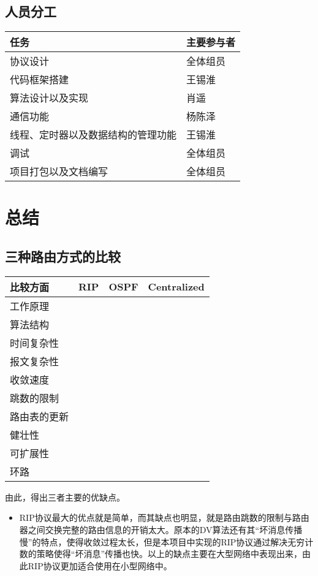 \documentclass[15pt]{ctexart}
\begin{document}
	\subsection{人员分工} %
	\label{sub:人员分工}
		\begin{table}[H]
			\centering
			\begin{tabular}{|l|l|}
				\hline
				任务 & 主要参与者 \\
				\hline
				协议设计 & 全体组员 \\
				\hline
				代码框架搭建 & 王锡淮 \\
				\hline
				算法设计以及实现 & 肖遥 \\
				\hline
				通信功能 & 杨陈泽 \\
				\hline
				线程、定时器以及数据结构的管理功能 & 王锡淮\\
				\hline 
				调试 & 全体组员 \\
				\hline
				项目打包以及文档编写 & 全体组员\\
				\hline
			\end{tabular}
		\end{table}

\section{总结} %
\label{sec:总结}
	\subsection{三种路由方式的比较} %
	\label{sub:三种路由方式的比较}
		\begin{table}[H]
			\begin{tabular}{|l|l|l|l|}
				\hline
				比较方面 & RIP & OSPF & Centralized \\
				\hline
				工作原理 &  &  &  \\
				\hline
				算法结构 &  &  &  \\
				\hline
				时间复杂性 &  &  &  \\
				\hline
				报文复杂性 &  &  &  \\
				\hline
				收敛速度 &  &  &  \\
				\hline
				跳数的限制 &  &  &  \\
				\hline
				路由表的更新 &  &  &  \\
				\hline
				健壮性 &  &  &  \\
				\hline
				可扩展性 &  &  &  \\
				\hline
				环路 &  &  &  \\
				\hline
			\end{tabular}
		\end{table}
		由此，得出三者主要的优缺点。
		\begin{itemize}
			\item RIP协议最大的优点就是简单，而其缺点也明显，就是路由跳数的限制与路由器之间交换完整的路由信息的开销太大。原本的DV算法还有其“坏消息传播慢”的特点，使得收敛过程太长，但是本项目中实现的RIP协议通过解决无穷计数的策略使得“坏消息”传播也快。以上的缺点主要在大型网络中表现出来，由此RIP协议更加适合使用在小型网络中。
		\end{itemize}
\end{document}

